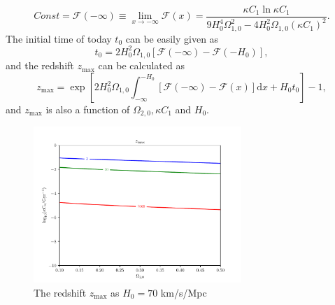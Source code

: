 \documentclass[twocolumn]{aastex631}
\begin{document}
   \begin{equation}
      Const=\mathcal{F}(-\infty)\equiv\lim_{x\to-\infty}\mathcal{F}(x)=
      \frac{\kappa C_1\ln\kappa C_1}{9H_0^4\Omega_{1,0}^2-4H_0^2\Omega_{1,0}(\kappa C_1)^2}.
   \end{equation}
   The initial time of today $t_0$ can be easily given as
   \begin{equation}
      t_0=2H_0^2\Omega_{1,0}[\mathcal{F}(-\infty)-\mathcal{F}(-H_0)],
   \end{equation}
   and the redshift $z_{\max}$ can be calculated as
   \begin{equation}
      z_{\max}=\exp\left[2H_0^2\Omega_{1,0}\int_{-\infty}^{-H_0}[\mathcal{F}(-\infty)
      -\mathcal{F}(x)]\mathrm{d}x+H_0t_0\right]-1,
   \end{equation}
   and $z_{\max}$ is also a function of $\Omega_{2,0}, \kappa C_1$ and $H_0$.
   \begin{figure}
      \centering
      \includegraphics[width=0.7\textwidth]{zmax.pdf}
      \caption{The redshift $z_{\max}$ as $H_0=70$ km/s/Mpc}
      \label{fig:3}
   \end{figure}



\end{document}
